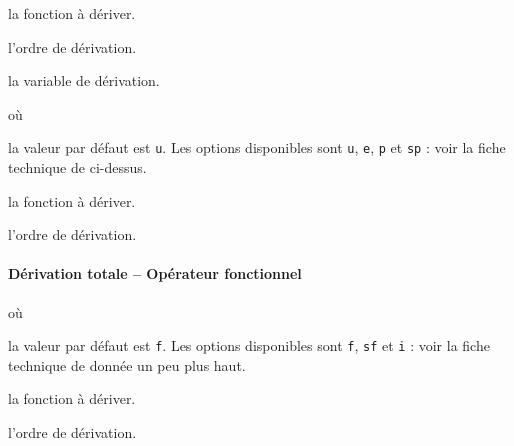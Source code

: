 \documentclass[12pt,a4paper]{article}
\begin{document}
 la fonction à dériver.

 l'ordre de dérivation.

 la variable de dérivation.


\separation


 où \quad {}

\IDoption{} la valeur par défaut est \verb+u+. Les options disponibles sont \verb+u+, \verb+e+, \verb+p+ et \verb+sp+ : voir la fiche technique de  ci-dessus.

 la fonction à dériver.

 l'ordre de dérivation.




\paragraph{Dérivation totale -- Opérateur fonctionnel}

 où \quad {}

\IDoption{} la valeur par défaut est \verb+f+. Les options disponibles sont \verb+f+, \verb+sf+ et \verb+i+ : voir la fiche technique de  donnée un peu plus haut.

 la fonction à dériver.

 l'ordre de dérivation.
\end{document}
